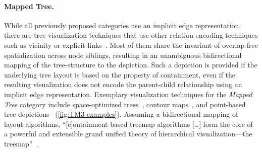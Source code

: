 \documentclass[a4paper,twoside]{article}
\begin{document}
\paragraph{Mapped Tree.}%
While all previously proposed categories use an implicit edge representation, there are tree visualization techniques that use other relation encoding techniques such as vicinity or explicit links~\cite{schulz2013-generativelayout}.
Most of them share the invariant of overlap-free spatialization across node siblings, resulting in an unambiguous bidirectional mapping of the tree-structure to the depiction.
Such a depiction is provided if the underlying tree layout is based on the property of containment, even if the resulting visualization does not encode the parent-child relationship using an implicit edge representation.
Exemplary visualization techniques for the \emph{Mapped Tree} category include space-optimized trees~\cite{nguyen2002-sot}, contour maps~\cite{kubota2006-visualization}, and point-based tree depictions~\cite{schulz2011-pointbased} (\autoref{fig:TM3-examples}).
Assuming a bidirectional mapping of layout algorithms, \enquote{[c]ontainment based treemap algorithms [\ldots] form the core of a powerful and extensible grand unified theory of hierarchical visualization---the treemap}~\cite{johnson1993-categorical}.
\end{document}
